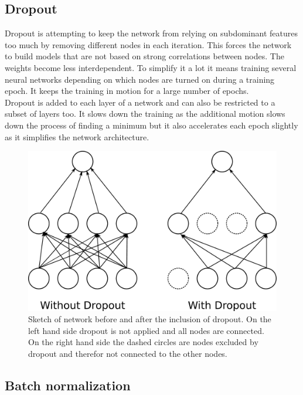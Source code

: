 \subsection{Dropout}
\label{sec:dropout}

Dropout is attempting to keep the network from relying on subdominant features too much by removing different nodes in each iteration. This forces the network to build models that are not based on strong correlations between nodes. The weights become less interdependent. To simplify it a lot it means training several neural networks depending on which nodes are turned on during a training epoch. It keeps the training in motion for a large number of epochs.\\
Dropout is added to each layer of a network and can also be  restricted to a subset of layers too. It slows down the training as the additional motion slows down the process of finding a minimum but it also accelerates each epoch slightly as it simplifies the network architecture. 

\begin{figure}
	\centering
	\includegraphics[scale = 0.1]{figures_ML/dropout.eps}
	\caption{Sketch of network before and after the inclusion of dropout. On the left hand side dropout is not applied and all nodes are connected. On the right hand side the dashed circles are nodes excluded by dropout and therefor not connected to the other nodes.}
	\label{fig:dropout}
\end{figure}



\subsection{Batch normalization}
\label{sec:batch_norm}

